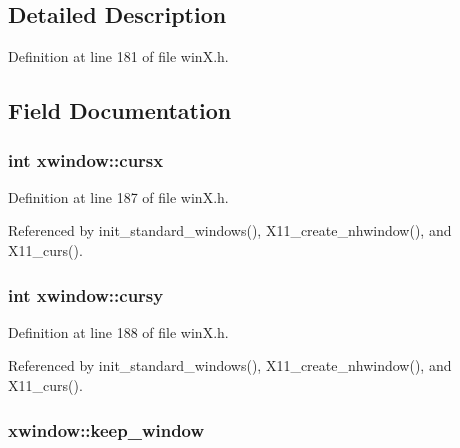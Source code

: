 \subsection{Detailed Description}


Definition at line 181 of file win\+X.\+h.



\subsection{Field Documentation}
\hypertarget{structxwindow_a065050011feaee6a1bcacbf1bf52ae68}{
\subsubsection[{cursx}]{\setlength{\rightskip}{0pt plus 5cm}int xwindow\+::cursx}}\label{structxwindow_a065050011feaee6a1bcacbf1bf52ae68}


Definition at line 187 of file win\+X.\+h.



Referenced by init\+\_\+standard\+\_\+windows(), X11\+\_\+create\+\_\+nhwindow(), and X11\+\_\+curs().

\hypertarget{structxwindow_a3a83f758525fbb15e87bd9e850b41ca5}{
\subsubsection[{cursy}]{\setlength{\rightskip}{0pt plus 5cm}int xwindow\+::cursy}}\label{structxwindow_a3a83f758525fbb15e87bd9e850b41ca5}


Definition at line 188 of file win\+X.\+h.



Referenced by init\+\_\+standard\+\_\+windows(), X11\+\_\+create\+\_\+nhwindow(), and X11\+\_\+curs().

\hypertarget{structxwindow_aa386fb9cd6e2a29ee3df76aa4307c401}{
\subsubsection[{keep\+\_\+window}]{ xwindow\+::keep\+\_\+window}}\label{structxwindow_aa386fb9cd6e2a29ee3df76aa4307c401}



